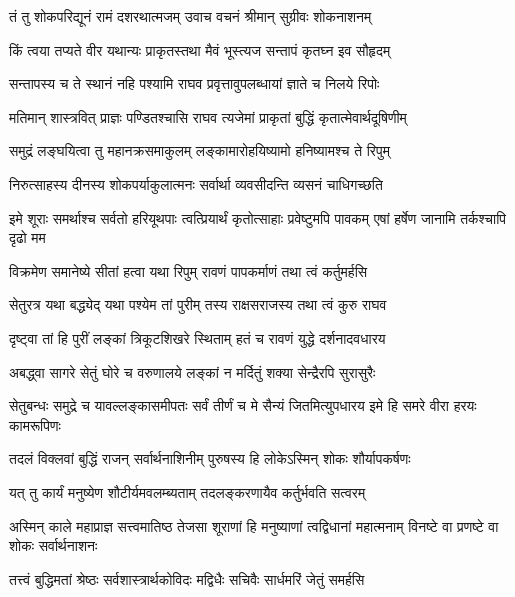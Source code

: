 
\twolineshloka
{तं तु शोकपरिद्यूनं रामं दशरथात्मजम्}
{उवाच वचनं श्रीमान् सुग्रीवः शोकनाशनम्} %

\twolineshloka
{किं त्वया तप्यते वीर यथान्यः प्राकृतस्तथा}
{मैवं भूस्त्यज सन्तापं कृतघ्न इव सौहृदम्} %

\twolineshloka
{सन्तापस्य च ते स्थानं नहि पश्यामि राघव}
{प्रवृत्तावुपलब्धायां ज्ञाते च निलये रिपोः} %

\twolineshloka
{मतिमान् शास्त्रवित् प्राज्ञः पण्डितश्चासि राघव}
{त्यजेमां प्राकृतां बुद्धिं कृतात्मेवार्थदूषिणीम्} %

\twolineshloka
{समुद्रं लङ्घयित्वा तु महानक्रसमाकुलम्}
{लङ्कामारोहयिष्यामो हनिष्यामश्च ते रिपुम्} %

\twolineshloka
{निरुत्साहस्य दीनस्य शोकपर्याकुलात्मनः}
{सर्वार्था व्यवसीदन्ति व्यसनं चाधिगच्छति} %

\threelineshloka
{इमे शूराः समर्थाश्च सर्वतो हरियूथपाः}
{त्वत्प्रियार्थं कृतोत्साहाः प्रवेष्टुमपि पावकम्}
{एषां हर्षेण जानामि तर्कश्चापि दृढो मम} %

\twolineshloka
{विक्रमेण समानेष्ये सीतां हत्वा यथा रिपुम्}
{रावणं पापकर्माणं तथा त्वं कर्तुमर्हसि} %

\twolineshloka
{सेतुरत्र यथा बद्ध्येद् यथा पश्येम तां पुरीम्}
{तस्य राक्षसराजस्य तथा त्वं कुरु राघव} %

\twolineshloka
{दृष्ट्वा तां हि पुरीं लङ्कां त्रिकूटशिखरे स्थिताम्}
{हतं च रावणं युद्धे दर्शनादवधारय} %

\twolineshloka
{अबद्ध्वा सागरे सेतुं घोरे च वरुणालये}
{लङ्कां न मर्दितुं शक्या सेन्द्रैरपि सुरासुरैः} %

\threelineshloka
{सेतुबन्धः समुद्रे च यावल्लङ्कासमीपतः}
{सर्वं तीर्णं च मे सैन्यं जितमित्युपधारय}
{इमे हि समरे वीरा हरयः कामरूपिणः} %

\twolineshloka
{तदलं विक्लवां बुद्धिं राजन् सर्वार्थनाशिनीम्}
{पुरुषस्य हि लोकेऽस्मिन् शोकः शौर्यापकर्षणः} %

\twolineshloka
{यत् तु कार्यं मनुष्येण शौटीर्यमवलम्ब्यताम्}
{तदलङ्करणायैव कर्तुर्भवति सत्वरम्} %

\threelineshloka
{अस्मिन् काले महाप्राज्ञ सत्त्वमातिष्ठ तेजसा}
{शूराणां हि मनुष्याणां त्वद्विधानां महात्मनाम्}
{विनष्टे वा प्रणष्टे वा शोकः सर्वार्थनाशनः} %

\twolineshloka
{तत्त्वं बुद्धिमतां श्रेष्ठः सर्वशास्त्रार्थकोविदः}
{मद्विधैः सचिवैः सार्धमरिं जेतुं समर्हसि} %

